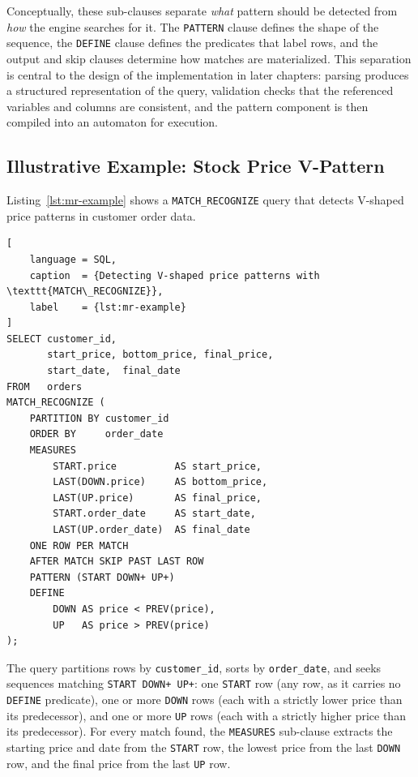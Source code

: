 Conceptually, these sub-clauses separate \emph{what} pattern should
be detected from \emph{how} the engine searches for it.  The
\texttt{PATTERN} clause defines the shape of the sequence, the
\texttt{DEFINE} clause defines the predicates that label rows, and
the output and skip clauses determine how matches are materialized.
This separation is central to the design of the implementation in
later chapters: parsing produces a structured representation of the
query, validation checks that the referenced variables and columns are
consistent, and the pattern component is then compiled into an
automaton for execution.

\subsection{Illustrative Example: Stock Price V-Pattern}
\label{subsec:bg-example}

Listing~\ref{lst:mr-example} shows a \texttt{MATCH\_RECOGNIZE}
query that detects V-shaped price patterns in customer order data.

\begin{lstlisting}[
    language = SQL,
    caption  = {Detecting V-shaped price patterns with \texttt{MATCH\_RECOGNIZE}},
    label    = {lst:mr-example}
]
SELECT customer_id,
       start_price, bottom_price, final_price,
       start_date,  final_date
FROM   orders
MATCH_RECOGNIZE (
    PARTITION BY customer_id
    ORDER BY     order_date
    MEASURES
        START.price          AS start_price,
        LAST(DOWN.price)     AS bottom_price,
        LAST(UP.price)       AS final_price,
        START.order_date     AS start_date,
        LAST(UP.order_date)  AS final_date
    ONE ROW PER MATCH
    AFTER MATCH SKIP PAST LAST ROW
    PATTERN (START DOWN+ UP+)
    DEFINE
        DOWN AS price < PREV(price),
        UP   AS price > PREV(price)
);
\end{lstlisting}

The query partitions rows by \texttt{customer\_id}, sorts by
\texttt{order\_date}, and seeks sequences matching
\texttt{START~DOWN+~UP+}: one \texttt{START} row (any row, as it
carries no \texttt{DEFINE} predicate), one or more \texttt{DOWN}
rows (each with a strictly lower price than its predecessor), and
one or more \texttt{UP} rows (each with a strictly higher price
than its predecessor).  For every match found, the \texttt{MEASURES}
sub-clause extracts the starting price and date from the
\texttt{START} row, the lowest price from the last \texttt{DOWN}
row, and the final price from the last \texttt{UP} row.


